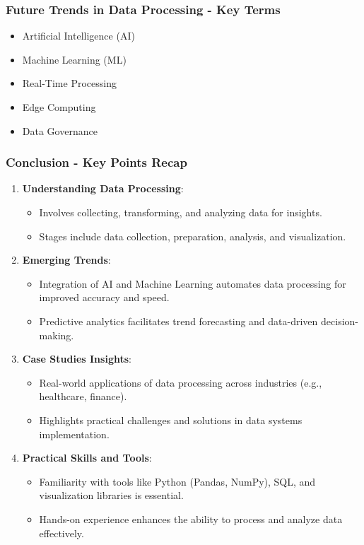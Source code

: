 \documentclass[aspectratio=169]{beamer}
\begin{document}
\begin{frame}[fragile]
    \frametitle{Future Trends in Data Processing - Key Terms}
    \begin{itemize}
        \item Artificial Intelligence (AI)
        \item Machine Learning (ML)
        \item Real-Time Processing
        \item Edge Computing
        \item Data Governance
    \end{itemize}
\end{frame}

\begin{frame}[fragile]
    \frametitle{Conclusion - Key Points Recap}
    \begin{enumerate}
        \item \textbf{Understanding Data Processing}:
        \begin{itemize}
            \item Involves collecting, transforming, and analyzing data for insights.
            \item Stages include data collection, preparation, analysis, and visualization.
        \end{itemize}
        
        \item \textbf{Emerging Trends}:
        \begin{itemize}
            \item Integration of AI and Machine Learning automates data processing for improved accuracy and speed.
            \item Predictive analytics facilitates trend forecasting and data-driven decision-making.
        \end{itemize}
        
        \item \textbf{Case Studies Insights}:
        \begin{itemize}
            \item Real-world applications of data processing across industries (e.g., healthcare, finance).
            \item Highlights practical challenges and solutions in data systems implementation.
        \end{itemize}
        
        \item \textbf{Practical Skills and Tools}:
        \begin{itemize}
            \item Familiarity with tools like Python (Pandas, NumPy), SQL, and visualization libraries is essential.
            \item Hands-on experience enhances the ability to process and analyze data effectively.
        \end{itemize}
    \end{enumerate}
\end{frame}
\end{document}
